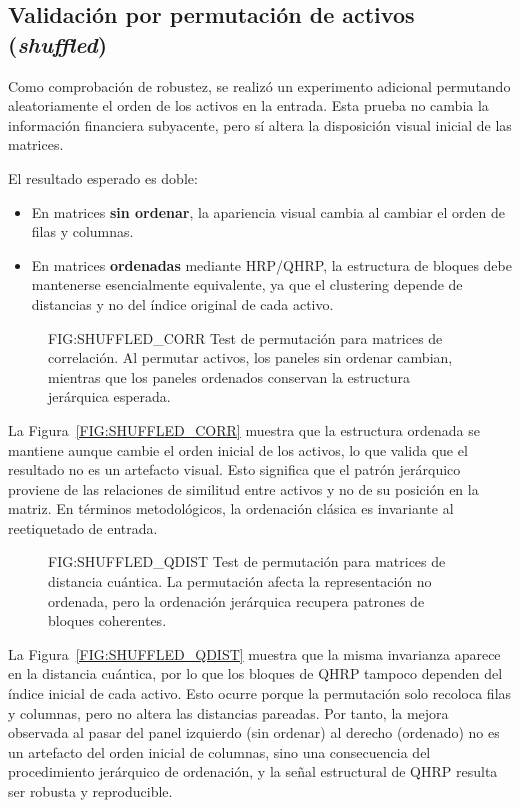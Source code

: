 \subsection{Validación por permutación de activos (\textit{shuffled})}
Como comprobación de robustez, se realizó un experimento adicional permutando aleatoriamente el orden de los activos en la entrada. Esta prueba no cambia la información financiera subyacente, pero sí altera la disposición visual inicial de las matrices.

El resultado esperado es doble:

\begin{itemize}
	\item En matrices \textbf{sin ordenar}, la apariencia visual cambia al cambiar el orden de filas y columnas.
	\item En matrices \textbf{ordenadas} mediante HRP/QHRP, la estructura de bloques debe mantenerse esencialmente equivalente, ya que el clustering depende de distancias y no del índice original de cada activo.
\end{itemize}

\begin{figure}[Validación shuffled en correlación]{FIG:SHUFFLED_CORR}
{Test de permutación para matrices de correlación. Al permutar activos, los paneles sin ordenar cambian, mientras que los paneles ordenados conservan la estructura jerárquica esperada.}
\end{figure}

La Figura~\ref{FIG:SHUFFLED_CORR} muestra que la estructura ordenada se mantiene aunque cambie el orden inicial de los activos, lo que valida que el resultado no es un artefacto visual. Esto significa que el patrón jerárquico proviene de las relaciones de similitud entre activos y no de su posición en la matriz. En términos metodológicos, la ordenación clásica es invariante al reetiquetado de entrada.

\begin{figure}[Validación shuffled en distancia cuántica]{FIG:SHUFFLED_QDIST}
{Test de permutación para matrices de distancia cuántica. La permutación afecta la representación no ordenada, pero la ordenación jerárquica recupera patrones de bloques coherentes.}
\end{figure}

La Figura~\ref{FIG:SHUFFLED_QDIST} muestra que la misma invarianza aparece en la distancia cuántica, por lo que los bloques de QHRP tampoco dependen del índice inicial de cada activo. Esto ocurre porque la permutación solo recoloca filas y columnas, pero no altera las distancias pareadas. Por tanto, la mejora observada al pasar del panel izquierdo (sin ordenar) al derecho (ordenado) no es un artefacto del orden inicial de columnas, sino una consecuencia del procedimiento jerárquico de ordenación, y la señal estructural de QHRP resulta ser robusta y reproducible.

